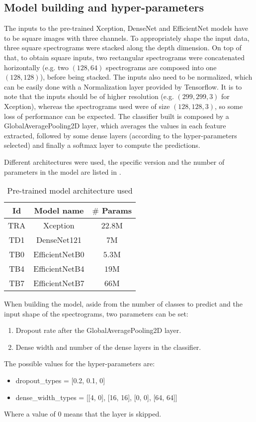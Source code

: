 \subsection{Model building and hyper-parameters}

The inputs to the pre-trained Xception, DenseNet and EfficientNet models have
to be square images with three channels.
To appropriately shape the input data, three square spectrograms were stacked
along the depth dimension.
On top of that, to obtain square inputs, two rectangular spectrograms were
concatenated horizontally (e.g. two $\left( 128, 64 \right)$ spectrograms are
composed into one $\left( 128, 128 \right)$), before being stacked.
The inputs also need to be normalized, which can be easily done with a
Normalization layer provided by Tensorflow.
It is to note that the inputs should be of higher resolution (e.g. $\left( 299,
299, 3 \right)$ for Xception), whereas the spectrograms used were of size
$\left( 128, 128, 3 \right)$, so some loss of performance can be expected.
The classifier built is composed by a GlobalAveragePooling2D layer, which
averages the values in each feature extracted, followed by some dense layers
(according to the hyper-parameters selected) and finally a softmax layer to
compute the predictions.

Different architectures were used, the specific version and the number of 
parameters in the model are listed in .
\begin{table}[ht!]
    \centering
    \caption{Pre-trained model architecture used}
    \label{tab:transfer_models_list}
    \begin{tabular}{|c|c|c|}
        \hline
        Id & Model name & $\#$ Params \\
        \hline
        TRA & Xception        & $22.8$M \\
        TD1 & DenseNet121     & $7$M    \\
        TB0 & EfficientNetB0  & $5.3$M  \\
        TB4 & EfficientNetB4  & $19$M   \\
        TB7 & EfficientNetB7  & $66$M   \\
        \hline
    \end{tabular}
\end{table}

When building the model, aside from the number of classes to predict and the
input shape of the spectrograms, two parameters can be set:
\begin{enumerate}
    \item Dropout rate after the GlobalAveragePooling2D layer.
    \item Dense width and number of the dense layers in the classifier.
\end{enumerate}
The possible values for the hyper-parameters are:
\begin{itemize}
    \item dropout\_types = [0.2, 0.1, 0]
    \item dense\_width\_types = [[4, 0], [16, 16], [0, 0], [64, 64]]
\end{itemize}
Where a value of $0$ means that the layer is skipped.

